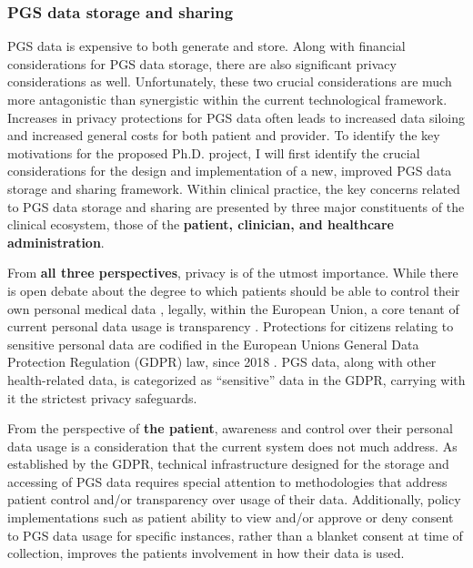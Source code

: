 \documentclass[runningheads]{llncs}
\begin{document}
\subsubsection{PGS data storage and sharing} 
PGS data is expensive to both generate and store. 
Along with financial considerations for PGS data storage, there are also significant privacy considerations as well.
Unfortunately, these two crucial considerations are much more antagonistic than synergistic within the current technological framework.
Increases in privacy protections for PGS data often leads to increased data siloing and increased general costs for both patient and provider.
To identify the key motivations for the proposed Ph.D. project, I will first identify the crucial considerations for the design and implementation of a new, improved PGS data storage and sharing framework.
Within clinical practice, the key concerns related to PGS data storage and sharing are presented by three major constituents of the clinical ecosystem, those of the \textbf{patient, clinician, and healthcare administration}. 


From \textbf{all three perspectives}, privacy is of the utmost importance. 
While there is open debate about the degree to which patients should be able to control their own personal medical data \cite{blumenthal_giving_2015,damen_patients_2022}, legally, within the European Union, a core tenant of current personal data usage is transparency \cite{spagnuelo_qualifying_2020}. 
Protections for citizens relating to sensitive personal data are codified in the European Union\textquotesingle s General Data Protection Regulation (GDPR) law, since 2018 \cite{noauthor_regulation_2016}. 
PGS data, along with other health-related data, is categorized as “sensitive” data in the GDPR, carrying with it the strictest privacy safeguards. 

From the perspective of \textbf{the patient}, awareness and control over their personal data usage is a consideration that the current system does not much address. 
As established by the GDPR, technical infrastructure designed for the storage and accessing of PGS data requires special attention to methodologies that address patient control and/or transparency over usage of their data. 
Additionally, policy implementations such as patient ability to view and/or approve or deny consent to PGS data usage for specific instances, rather than a blanket consent at time of collection, improves the patient\textquotesingle s involvement in how their data is used. 
\end{document}
